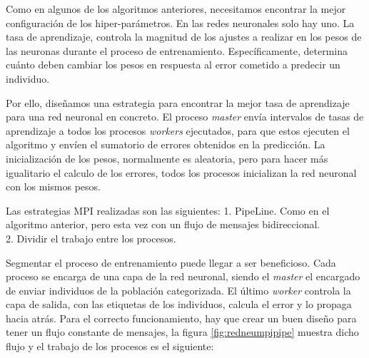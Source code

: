 	
	Como en algunos de los algoritmos anteriores, necesitamos encontrar la mejor configuración de los hiper-parámetros. En las redes neuronales solo hay uno. La tasa de aprendizaje, controla la magnitud de los ajustes a realizar en los pesos de las neuronas durante el proceso de entrenamiento. Específicamente, determina cuánto deben cambiar los pesos en respuesta al error cometido a predecir un individuo.
	
	
	Por ello, diseñamos una estrategia para encontrar la mejor tasa de aprendizaje para una red neuronal en concreto. El proceso \textit{master} envía intervalos de tasas de aprendizaje a todos los procesos \textit{workers} ejecutados, para que estos ejecuten el algoritmo y envíen el sumatorio de errores obtenidos en la predicción. La inicialización de los pesos, normalmente es aleatoria, pero para hacer más igualitario el calculo de los errores, todos los procesos inicializan la red neuronal con los mismos pesos.
	
	
	
	\begin{flushleft}		
		Las estrategias MPI realizadas son las siguientes:
		1. PipeLine. Como en el algoritmo anterior, pero esta vez con un flujo de mensajes bidireccional.\\
		2. Dividir el trabajo entre los procesos.
	\end{flushleft}
	
	Segmentar el proceso de entrenamiento puede llegar a ser beneficioso. Cada proceso se encarga de una capa de la red neuronal, siendo el \textit{master} el encargado de enviar individuos de la población categorizada. El último \textit{worker} controla la capa de salida, con las etiquetas de los individuos, calcula el error y lo propaga hacia atrás. Para el correcto funcionamiento, hay que crear un buen diseño para tener un flujo constante de mensajes, la figura \ref{fig:redneumpipipe} muestra dicho flujo y el trabajo de los procesos es el siguiente:	
	
